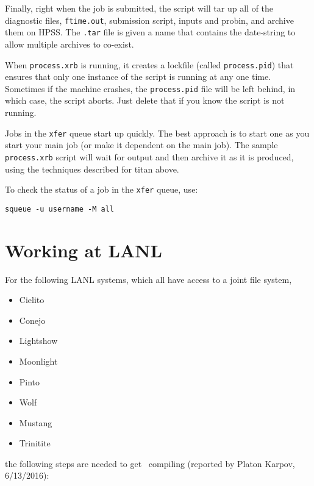 Finally, right when the job is submitted, the script will tar up all
of the diagnostic files, {\tt ftime.out}, submission script, inputs
and probin, and archive them on HPSS.  The {\tt .tar} file is given a
name that contains the date-string to allow multiple archives to
co-exist.
                                                                    
When {\tt process.xrb} is running, it creates a lockfile (called              
{\tt process.pid}) that ensures that only one instance of the script            
is running at any one time.  Sometimes if the machine crashes, the              
{\tt process.pid} file will be left behind, in which case, the script           
aborts.  Just delete that if you know the script is not running.   

Jobs in the {\tt xfer} queue start up quickly.  The best approach is            
to start one as you start your main job (or make it dependent on the            
main job).  The sample {\tt process.xrb} script will wait for output            
and then archive it as it is produced, using the techniques described           
for titan above.                                                                
                                                                                
To check the status of a job in the {\tt xfer} queue, use:                      
\begin{verbatim}                                                                
squeue -u username -M all                                                       
\end{verbatim}           



\section{Working at LANL}

For the following LANL systems, which all have access to a joint file system,
\begin{itemize}
  \item Cielito
  \item Conejo
  \item Lightshow
  \item Moonlight
  \item Pinto
  \item Wolf
  \item Mustang
  \item Trinitite
\end{itemize}
the following steps are needed to get \castro\ compiling (reported by Platon Karpov, 6/13/2016):

